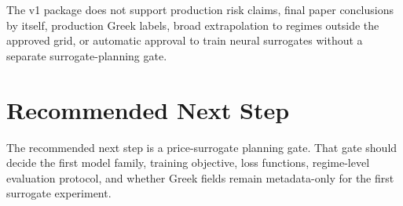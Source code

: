 \documentclass[11pt,a4paper]{article}
\begin{document}
The v1 package does not support production risk claims, final paper conclusions by itself,
production Greek labels, broad extrapolation to regimes outside the approved grid, or automatic
approval to train neural surrogates without a separate surrogate-planning gate.

\section{Recommended Next Step}

The recommended next step is a price-surrogate planning gate. That gate should decide the first
model family, training objective, loss functions, regime-level evaluation protocol, and whether
Greek fields remain metadata-only for the first surrogate experiment.



\end{document}
